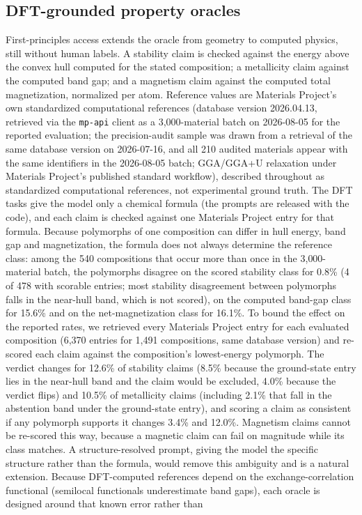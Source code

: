 \documentclass[pdflatex,sn-nature]{sn-jnl}
\newcommand{\rev}[1]{#1}
\newcommand{\rev}[1]{{\color{blue}#1}}
\begin{document}
\subsection*{DFT-grounded property oracles}
First-principles access extends the oracle from geometry to computed physics, still
without human labels. A stability claim is checked against the energy above the
convex hull computed for the stated composition; a metallicity claim against the
computed band gap; and a magnetism claim against the computed total magnetization,
normalized per atom. Reference values are Materials Project's own standardized
computational references (database version 2026.04.13, \rev{retrieved via the
\texttt{mp-api} client as a 3{,}000-material batch on 2026-08-05 for the reported evaluation; the
precision-audit sample was drawn from a retrieval of the same database version on 2026-07-16, and all
210 audited materials appear with the same identifiers in the 2026-08-05 batch}; GGA/GGA+U relaxation under Materials Project's published standard workflow), described throughout as standardized computational references, not experimental ground truth. \rev{The DFT tasks give the model only a
chemical formula (the prompts are released with the code), and each claim is checked against one
Materials Project entry for that formula. Because polymorphs of one composition can differ in hull
energy, band gap and magnetization, the formula does not always determine the reference class: among
the 540 compositions that occur more than once in the 3{,}000-material batch, the polymorphs disagree
on the scored stability class for 0.8\% (4 of 478 with scorable entries; most stability disagreement
between polymorphs falls in the near-hull band, which is not scored), on the computed band-gap class for
15.6\% and on the net-magnetization class for 16.1\%. To bound the effect on the reported rates, we retrieved every Materials Project
entry for each evaluated composition (6{,}370 entries for 1{,}491 compositions, same database version)
and re-scored each claim against the composition's lowest-energy polymorph. The verdict changes for
12.6\% of stability claims (8.5\% because the ground-state entry lies in the near-hull band and the claim
would be excluded, 4.0\% because the verdict flips) and 10.5\% of metallicity claims (including 2.1\% that
fall in the abstention band under the ground-state entry), and scoring a claim as consistent if any
polymorph supports it changes 3.4\% and 12.0\%. Magnetism claims cannot be re-scored this way, because a
magnetic claim can fail on magnitude while its class matches. A structure-resolved prompt, giving the
model the specific structure rather than the formula, would remove this ambiguity and is a natural
extension.} Because DFT-computed references depend on the exchange-correlation functional (semilocal functionals underestimate band gaps), each oracle is designed around that known error rather than
\end{document}
